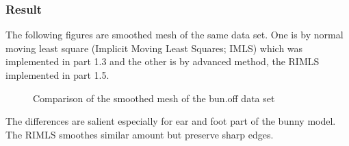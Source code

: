 \documentclass[paper=a4, fontsize=11pt]{scrartcl} %
\numberwithin{equation}{section} %
\numberwithin{figure}{section} %
\numberwithin{table}{section} %
\begin{document}
\subsubsection{Result}

The following figures are smoothed mesh of the same data set. One is by normal moving least square (Implicit Moving Least Squares; IMLS) which was implemented in part 1.3 and the other is by advanced method, the RIMLS implemented in part 1.5.

\begin{figure}[H]
\caption{Comparison of the smoothed mesh of the bun.off data set\label{fig:simple}}
\centering
{}
\end{figure}

The differences are salient especially for ear and foot part of the bunny model. The RIMLS smoothes similar amount but preserve sharp edges. 


\end{document}
